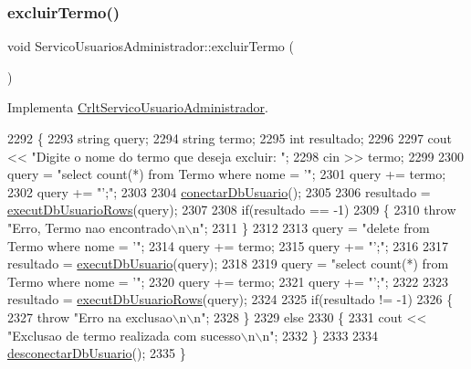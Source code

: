 \subsubsection{\texorpdfstring{excluir\+Termo()}{excluirTermo()}}
{\footnotesize\ttfamily void Servico\+Usuarios\+Administrador\+::excluir\+Termo (\begin{DoxyParamCaption}{ }\end{DoxyParamCaption})\hspace{0.3cm}{\ttfamily [virtual]}}



Implementa \mbox{\hyperlink{class_crlt_servico_usuario_administrador_aa56d5aaff3fcf0dce12f969db7089204}{Crlt\+Servico\+Usuario\+Administrador}}.


\begin{DoxyCode}
2292     \{
2293       \textcolor{keywordtype}{string} query;
2294       \textcolor{keywordtype}{string} termo;
2295       \textcolor{keywordtype}{int} resultado;
2296 
2297       cout << \textcolor{stringliteral}{"Digite o nome do termo que deseja excluir: "};
2298       cin >> termo;
2299 
2300       query = \textcolor{stringliteral}{"select count(*) from Termo where nome = '"};
2301       query += termo;
2302       query += \textcolor{stringliteral}{"';"};
2303 
2304       \mbox{\hyperlink{comando_sql_8cpp_a4f89ddcbc4cf8f2587d89f72f8c7900d}{conectarDbUsuario}}();
2305 
2306       resultado = \mbox{\hyperlink{comando_sql_8cpp_af54952694f2fa7d76f969fb74b853cb9}{executDbUsuarioRows}}(query);
2307 
2308       \textcolor{keywordflow}{if}(resultado == -1)
2309       \{
2310         \textcolor{keywordflow}{throw} \textcolor{stringliteral}{"Erro, Termo nao encontrado\(\backslash\)n\(\backslash\)n"};
2311       \}
2312 
2313       query = \textcolor{stringliteral}{"delete from Termo where nome = '"};
2314       query += termo;
2315       query += \textcolor{stringliteral}{"';"};
2316 
2317       resultado = \mbox{\hyperlink{comando_sql_8cpp_a748197580e7f9acdbf48c78de1f7924b}{executDbUsuario}}(query);
2318 
2319       query = \textcolor{stringliteral}{"select count(*) from Termo where nome = '"};
2320       query += termo;
2321       query += \textcolor{stringliteral}{"';"};
2322 
2323       resultado = \mbox{\hyperlink{comando_sql_8cpp_af54952694f2fa7d76f969fb74b853cb9}{executDbUsuarioRows}}(query);
2324 
2325       \textcolor{keywordflow}{if}(resultado != -1)
2326       \{
2327         \textcolor{keywordflow}{throw} \textcolor{stringliteral}{"Erro na exclusao\(\backslash\)n\(\backslash\)n"};
2328       \}
2329       \textcolor{keywordflow}{else}
2330       \{
2331         cout << \textcolor{stringliteral}{"Exclusao de termo realizada com sucesso\(\backslash\)n\(\backslash\)n"};
2332       \}
2333 
2334       \mbox{\hyperlink{comando_sql_8cpp_a969be9911913568e30d4ae8963338bc3}{desconectarDbUsuario}}();
2335     \}
\end{DoxyCode}
\mbox{\label{class_servico_usuarios_administrador_a1295e808f5e6322a8e329ff711b2b428}} 
